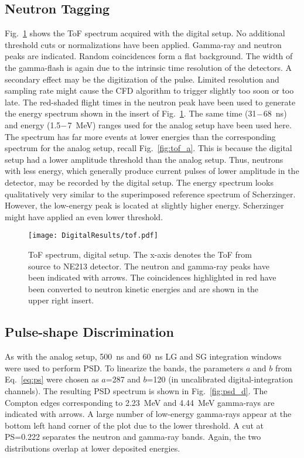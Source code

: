 \documentclass[main.tex]{subfiles}
\begin{document}
\subsection{Neutron Tagging}
Fig.~\ref{fig:tof_d} shows the ToF spectrum acquired with the digital setup. No additional threshold cuts or normalizations have been applied. Gamma-ray and neutron peaks are indicated. Random coincidences form a flat background. The width of the gamma-flash is again due to the intrinsic time resolution of the detectors. A secondary effect may be the digitization of the pulse. Limited resolution and sampling rate might cause the CFD algorithm to trigger slightly too soon or too late. 
The red-shaded flight times in the neutron peak have been used to generate the energy spectrum shown in the insert of Fig.~\ref{fig:tof_d}. The same time (31$\--$\SI{68}{\ns}) and energy (1.5$\--$\SI{7}{\MeV}) ranges used for the analog setup have been used here. The spectrum has far more events at lower energies than the corresponding spectrum for the analog setup, recall Fig.~\ref{fig:tof_a}. This is because the digital setup had a lower amplitude threshold than the analog setup. Thus, neutrons with less energy, which generally produce current pulses of lower amplitude in the detector, may be recorded by the digital setup. The energy spectrum looks qualitatively very similar to the superimposed reference spectrum of Scherzinger. However, the low-energy peak is located at slightly higher energy. Scherzinger might have applied an even lower threshold. 
\begin{figure}[ht]
    \centering
        \texttt{[image: DigitalResults/tof.pdf]}
        \caption[ToF spectrum, digital setup.]{ToF spectrum, digital setup. The x-axis denotes the ToF from source to NE213 detector. The neutron and gamma-ray peaks have been indicated with arrows. The coincidences highlighted in red have been converted to neutron kinetic energies and are shown in the upper right insert.}
        \label{fig:tof_d} 
\end{figure}
\subsection{Pulse-shape Discrimination}
As with the analog setup, \SI{500}{ns} and \SI{60}{ns} LG and SG integration windows were used to perform PSD.  To linearize the bands, the parameters $a$ and $b$ from Eq.~\ref{eq:ps} were chosen as $a$=287 and $b$=120 (in uncalibrated digital-integration channels).
The resulting PSD spectrum is shown in Fig.~\ref{fig:psd_d}. The Compton edges corresponding to \SI{2.23}{\MeV} and \SI{4.44}{MeV} gamma-rays are indicated with arrows. A large number of low-energy gamma-rays appear at the bottom left hand corner of the plot due to the lower threshold.
A cut at PS=0.222 separates the neutron and gamma-ray bands. Again, the two distributions overlap at lower deposited energies.
\end{document}
